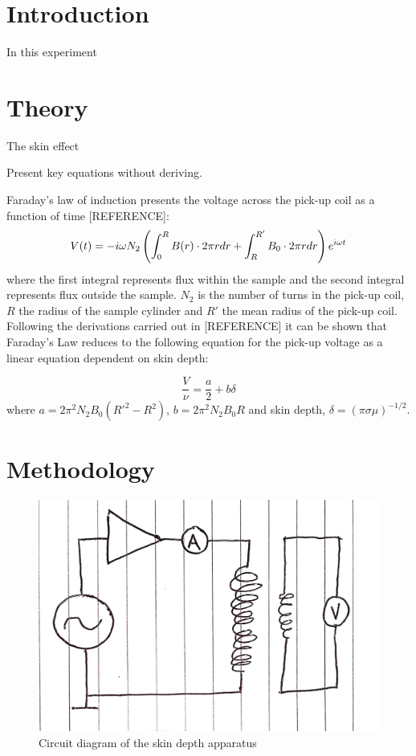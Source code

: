 \documentclass[a4paper,12pt,twocolumn]{article}
\begin{document}
\section{Introduction}
	In this experiment
	
\section{Theory}
	The skin effect

	Present key equations without deriving.
	
	Faraday's law of induction presents the voltage across the pick-up coil as a function of time [REFERENCE]:
	\begin{equation}
		\scriptsize
		V(t) = - i \omega N_2 \left( \int_{0}^{R} B(r) \cdot 2\pi r dr + \int_{R}^{R'} B_0 \cdot 2\pi r dr \right) e^{i\omega t}
	\end{equation}
	where the first integral represents flux within the sample and the second integral represents flux outside the sample. $N_2$ is the number of turns in the pick-up coil, $R$ the radius of the sample cylinder and $R'$ the mean radius of the pick-up coil.\\
	
	Following the derivations carried out in [REFERENCE] it can be shown that Faraday's Law reduces to the following equation for the pick-up voltage as a linear equation dependent on skin depth:
	
	\begin{equation}
		\frac{V}{\nu} = \frac{a}{2} + b\delta
		\label{eq:line}
	\end{equation}
	where $a = 2\pi^2 N_2 B_0 (R'^2-R^2)$, $b = 2\pi^2 N_2 B_0 R$ and skin depth, $\delta = (\pi \sigma \mu)^{-1/2}$.
	
\section{Methodology}
	
	\begin{figure}
		\centering
		\includegraphics[scale=0.1]{SDcircuit.jpg}
		\captionsetup{font=scriptsize}
		\caption{Circuit diagram of the skin depth apparatus}
		\label{fig:circuit}
	\end{figure}
\end{document}
